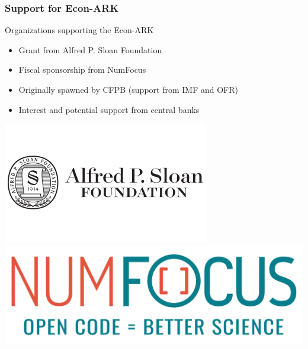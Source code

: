 \documentclass{beamer}
\newcommand{\bi}{\begin{itemize}}
\newcommand{\ei}{\end{itemize}}
\begin{document}
\begin{frame}
\frametitle{Support for Econ-ARK}

\begin{block}{Organizations supporting the Econ-ARK}
\bi

\item Grant from Alfred P. Sloan Foundation

\item Fiscal sponsorship from NumFocus

\item Originally spawned by CFPB (support from IMF and OFR)

\item Interest and potential support from central banks
\ei
\end{block}

\begin{center}
\includegraphics[scale=0.5]{SloanLogo.PNG} \includegraphics[scale=0.08]{NuMFocusLogo.PNG} 
\end{center}

\end{frame}
\end{document}
